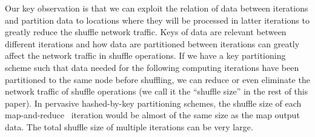 \documentclass[10pt,journal,compsoc]{IEEEtran}
\newcommand{\blue}[1]{\textcolor{blue}{#1}}
\begin{document}

Our key observation is that we can exploit the relation of data between iterations
and partition data to locations where they will be processed in latter iterations to greatly reduce 
the shuffle network traffic.
Keys of data are relevant between different iterations 
and how data are partitioned between iterations
can greatly affect the network traffic in shuffle operations.
If we have a key partitioning scheme such that data needed for the
following computing iterations have been partitioned to the same 
node before shuffling, we can reduce or even eliminate
the network traffic of shuffle operations (we call it the
``shuffle size'' in the rest of this paper). 
In pervasive hashed-by-key partitioning schemes, the shuffle size of
each map-and-reduce~\cite{dean2008mapreduce} iteration would be almost of the same size as the
map output data. The total shuffle size of multiple iterations
can be very large.
\end{document}
